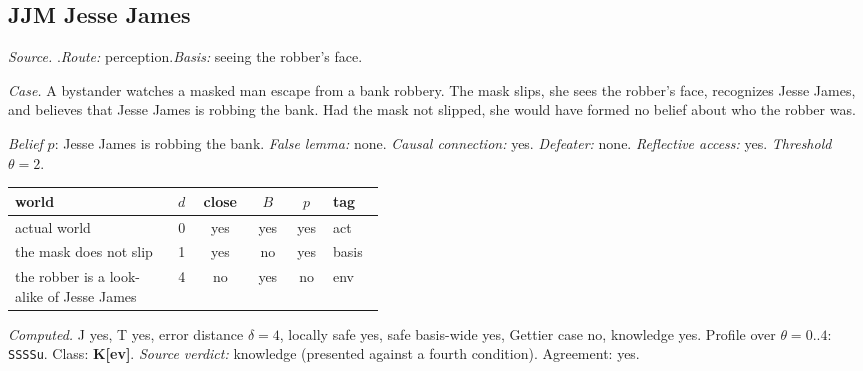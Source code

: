 \subsection*{JJM \enspace Jesse James}
\noindent\textit{Source.} \citet{Nozick1981}.\quad \textit{Route:} perception.\quad \textit{Basis:} seeing the robber's face.\par
\noindent\textit{Case.} A bystander watches a masked man escape from a bank robbery. The mask slips, she sees the robber's face, recognizes Jesse James, and believes that Jesse James is robbing the bank. Had the mask not slipped, she would have formed no belief about who the robber was.\par
\noindent\textit{Belief} $p$: Jesse James is robbing the bank.
 \textit{False lemma:} none. \textit{Causal connection:} yes. \textit{Defeater:} none. \textit{Reflective access:} yes. \textit{Threshold} $\theta = 2$.\par
\begin{center}\begin{tabular}{@{}p{0.43\linewidth}rcccl@{}}
world & $d$ & close & $B$ & $p$ & tag \\ \midrule
actual world & 0 & yes & yes & yes & act \\
the mask does not slip & 1 & yes & no & yes & basis \\
the robber is a look-alike of Jesse James & 4 & no & yes & no & env \\
\end{tabular}\end{center}
\noindent\textit{Computed.} J yes, T yes, error distance $\delta = 4$, locally safe yes, safe basis-wide yes, Gettier case no, knowledge yes. Profile over $\theta = 0..4$: \texttt{SSSSu}. Class: \textbf{K[ev]}.
 \textit{Source verdict:} knowledge (presented against a fourth condition). Agreement: yes.
\par\medskip
{}
